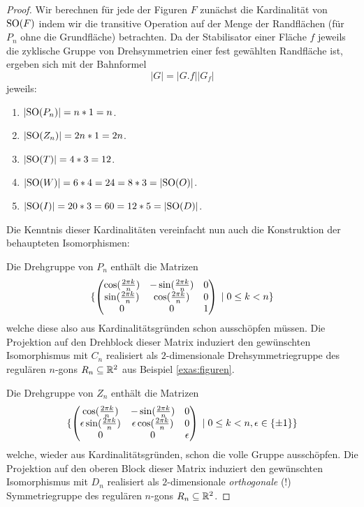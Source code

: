 \documentclass{book}
\begin{document}
\begin{proof}
    Wir berechnen für jede der Figuren $F$ zunächst die Kardinalität von
    ${\operatorname{SO}}(F)$ indem wir die transitive Operation auf der Menge der
    Randflächen (für $P_n$ ohne die Grundfläche) betrachten. Da der
    Stabilisator einer Fläche $f$ jeweils die zyklische Gruppe von
    Drehsymmetrien einer fest gewählten Randfläche ist, ergeben sich mit der
    Bahnformel
    \[
        |G| = |G.f| |G_f|
    \] jeweils: 
    \begin{enumerate}
        \item $|{\operatorname{SO}}(P_n)| = n * 1 = n$.
        \item $|{\operatorname{SO}}(Z_n)| = 2n * 1 = 2n$.
        \item $|{\operatorname{SO}}(T)| = 4 * 3 = 12$.
        \item $|{\operatorname{SO}}(W)| = 6 * 4 = 24 = 8 * 3 = |{\operatorname{SO}}(O)|$.
        \item $|{\operatorname{SO}}(I)| = 20 * 3 = 60 = 12 * 5 = |{\operatorname{SO}}(D)|$.
    \end{enumerate}

    Die Kenntnis dieser Kardinalitäten vereinfacht nun auch die Konstruktion
    der behaupteten Isomorphismen: 

    Die Drehgruppe von $P_n$ enthält die Matrizen
    \[
        \{ \begin{pmatrix}  \cos(\frac{2 \pi k}{n} ) & -\sin(\frac{2 \pi k}{n}) & 0\\
         \sin(\frac{2 \pi k}{n}) & \cos(\frac{2 \pi k}{n}) & 0\\
            0 & 0 & 1  \end{pmatrix} \; | \; 0 \le k < n \}
    \]
    welche diese also aus Kardinalitätsgründen schon ausschöpfen müssen. Die
    Projektion auf den Drehblock dieser Matrix induziert den gewünschten
    Isomorphismus mit $C_n$ realisiert als $2$-dimensionale Drehsymmetriegruppe
    des regulären $n$-gons $R_n \subseteq \mathbb{R}^2$ aus Beispiel \ref{exas:figuren}.

    Die Drehgruppe von $Z_n$ enthält die Matrizen
    \[
        \{ \begin{pmatrix}  \cos(\frac{2 \pi k}{n} ) & -\sin(\frac{2 \pi k}{n}) & 0\\
         \epsilon \sin(\frac{2 \pi k}{n}) & \epsilon \cos(\frac{2 \pi k}{n}) & 0\\
            0 & 0 & \epsilon  \end{pmatrix} \; | \; 0 \le k < n, \epsilon \in \{\pm 1\} \}
    \]
    welche, wieder aus Kardinalitätsgründen, schon die volle Gruppe ausschöpfen. Die 
    Projektion auf den oberen Block dieser Matrix induziert den gewünschten
    Isomorphismus mit $D_n$ realisiert als $2$-dimensionale {\em orthogonale}
    (!) Symmetriegruppe des regulären $n$-gons $R_n \subseteq \mathbb{R}^2$.


\end{proof}
\end{document}
